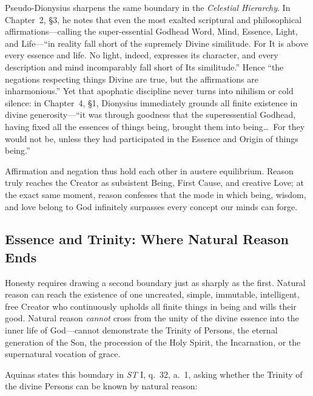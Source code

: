 Pseudo-Dionysius sharpens the same boundary in the \emph{Celestial Hierarchy}. In Chapter~2, \S3, he notes that even the most exalted scriptural and philosophical affirmations---calling the super-essential Godhead Word, Mind, Essence, Light, and Life---``in reality fall short of the supremely Divine similitude. For It is above every essence and life. No light, indeed, expresses its character, and every description and mind incomparably fall short of Its similitude.'' Hence ``the negations respecting things Divine are true, but the affirmations are inharmonious.'' Yet that apophatic discipline never turns into nihilism or cold silence: in Chapter~4, \S1, Dionysius immediately grounds all finite existence in divine generosity---``it was through goodness that the superessential Godhead, having fixed all the essences of things being, brought them into being\dots\ For they would not be, unless they had participated in the Essence and Origin of things being.''

Affirmation and negation thus hold each other in austere equilibrium. Reason truly reaches the Creator as subsistent Being, First Cause, and creative Love; at the exact same moment, reason confesses that the mode in which being, wisdom, and love belong to God infinitely surpasses every concept our minds can forge.

\subsection{Essence and Trinity: Where Natural Reason Ends}

Honesty requires drawing a second boundary just as sharply as the first. Natural reason can reach the existence of one uncreated, simple, immutable, intelligent, free Creator who continuously upholds all finite things in being and wills their good. Natural reason \emph{cannot} cross from the unity of the divine essence into the inner life of God---cannot demonstrate the Trinity of Persons, the eternal generation of the Son, the procession of the Holy Spirit, the Incarnation, or the supernatural vocation of grace.

Aquinas states this boundary in \emph{ST} I, q.\ 32, a.\ 1, asking whether the Trinity of the divine Persons can be known by natural reason:

